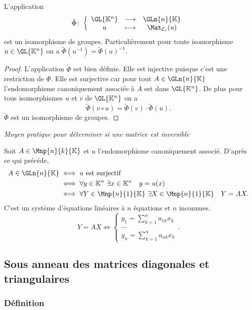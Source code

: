 \begin{theo}
  L'application
  \begin{equation}
    \fonction{\tilde{\Phi}}{\GL{\K^n}}{\GLn{n}{\K}}{u}{\Mat_{\E_c}(u)}
  \end{equation}
  est un isomorphisme de groupes. Particulièrement pour toute isomorphisme $u \in \GL{\K^n}$ on a $\tilde{\Phi}(u^{-1})=\tilde{\Phi}(u)^{-1}$.
\end{theo}
\begin{proof}
  L'application $\tilde{\Phi}$ est bien définie. Elle est injective puisque c'est une restriction de $\Phi$. Elle est surjective car pour tout $A \in \GLn{n}{\K}$ l'endomorphisme canoniquement associée à $A$ est dans $\GL{\K^n}$. De plus pour tous isomorphismes $u$ et $v$ de $\GL{\K^n}$ on a
\begin{equation}
  \tilde{\Phi}(v \circ u)= \tilde{\Phi}(v) \cdot \tilde{\Phi}(u).
\end{equation}
 $\tilde{\Phi}$ est un isomorphisme de groupes.
\end{proof}

\emph{Moyen pratique pour déterminer si une matrice est inversible}

Soit $A \in \Mnp{n}{k}{\K}$ et $u$ l'endomorphisme canoniquement associé. D'après ce qui précéde,
\begin{align}
  A \in \GLn{n}{\K} & \iff u \text{~est surjectif}\\
  & \iff \forall y \in \K^n \ \exists x \in \K^n \quad y=u(x)\\
  & \iff \forall Y \in \Mnp{n}{1}{\K} \ \exists X \in \Mnp{n}{1}{\K} \quad Y=AX.
\end{align}
C'est un système d'équations linéaires à $n$ équations et $n$ inconnues.
\begin{equation}
  Y=AX \iff \begin{cases} y_1 = \sum_{k=1}^n a_{1k} x_k \\ \ldots \\ y_n = \sum_{k=1}^n a_{nk} x_k \end{cases}.
\end{equation}

\subsection{Sous anneau des matrices diagonales et triangulaires}

\subsubsection{Définition}

